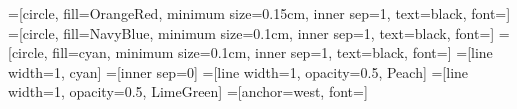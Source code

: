 
=[circle, fill=OrangeRed, minimum size=0.15cm, inner sep=1, text=black, font=\tiny]
=[circle, fill=NavyBlue, minimum size=0.1cm, inner sep=1, text=black, font=\tiny]
=[circle, fill=cyan, minimum size=0.1cm, inner sep=1, text=black, font=\tiny]
=[line width=1, cyan]
=[inner sep=0]
=[line width=1, opacity=0.5, Peach]
=[line width=1, opacity=0.5, LimeGreen]
=[anchor=west, font=\small]

\newcommand{\newedgeshort}[2]{
  \draw[newedge] (#1,#2) ++(-.5,0) -- +(1,0);
  \draw[newedge] (#1,#2) ++(0,-.5) -- +(0,1);
}

\newcommand{\newedgelong}[2]{
  \draw[newedge] (#1,#2) ++(-.5,0) -- +(-.5,0) node[newnode]{};
  \draw[newedge] (#1,#2) ++(.5,0) -- +(.5,0) node[newnode]{};
  \draw[newedge] (#1,#2) ++(0,-.5) -- +(0,-.5) node[newnode]{};
  \draw[newedge] (#1,#2) ++(0,.5) -- +(0,.5) node[newnode]{};
}

\newcommand{\newerasureshort}[2]{
  \draw[erasure] (#1,#2) ++(-.5,0) -- +(1,0);
  \draw[erasure] (#1,#2) ++(0,-.5) -- +(0,1);
}

